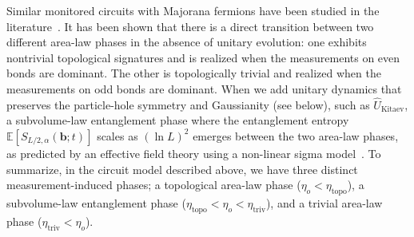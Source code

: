\documentclass[preprint,pteplogo]{ptephy_v2}%
\numberwithin{equation}{section}
\theoremstyle{definition}
\begin{document}
Similar monitored circuits with Majorana fermions have been studied in the literature~\cite{Nahum2020entanglement, Merritt2023entanglement, kells2023topological, nehra2025controlling, loio2023purification, Klocke23majorana, fava2023nonlinear}. 
It has been shown that there is a direct transition between two different area-law phases in the absence of unitary evolution: 
one exhibits nontrivial topological signatures and is realized when the measurements on even bonds are dominant.
The other is topologically trivial and realized when the measurements on odd bonds are dominant.
When we add unitary dynamics that preserves the particle-hole symmetry and Gaussianity (see below), such as $\hat{U}_{\mathrm{Kitaev}}$, a subvolume-law entanglement phase where the entanglement entropy $\mathbb{E}[S_{L/2,\alpha}(\bm{b};t)]$ scales as $(\ln L)^2$ emerges between the two area-law phases, as predicted by an effective field theory using a non-linear sigma model~\cite{fava2023nonlinear}.
To summarize, in the circuit model described above, we have three distinct measurement-induced phases; a topological area-law phase ($\eta_o<\eta_{\mathrm{topo}}$), a subvolume-law entanglement phase ($\eta_{\mathrm{topo}}<\eta_o<\eta_{\mathrm{triv}}$), and a trivial area-law phase ($\eta_{\mathrm{triv}}<\eta_o$).
\end{document}
